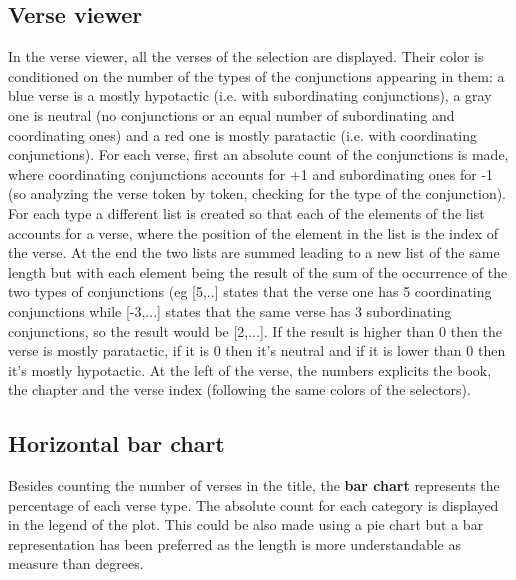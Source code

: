 \documentclass[sigchi]{article}
\begin{document}
\subsection{Verse viewer}
In the verse viewer, all the verses of the selection are displayed. Their color is conditioned on the number of the types of the conjunctions appearing in them: a blue verse is a mostly hypotactic (i.e. with subordinating conjunctions), a gray one is neutral (no conjunctions or an equal number of subordinating and coordinating ones) and a red one is mostly paratactic (i.e. with coordinating conjunctions). For each verse, first an absolute count of the conjunctions is made, where coordinating conjunctions accounts for +1 and subordinating ones for -1 (so analyzing the verse token by token, checking for the type of the conjunction). For each type a different list is created so that each of the elements of the list accounts for a verse, where the position of the element in the list is the index of the verse. At the end the two lists are summed leading to a new list of the same length but with each element being the result of the sum of the occurrence of the two types of conjunctions (eg [5,..] states that the verse one has 5 coordinating conjunctions while [-3,...] states that the same verse has 3 subordinating conjunctions, so the result would be [2,...]. If the result is higher than 0 then the verse is mostly paratactic, if it is 0 then it’s neutral and if it is lower than 0 then it’s mostly hypotactic.
At the left of the verse, the numbers explicits the book, the chapter and the verse index (following the same colors of the selectors).
\subsection{Horizontal bar chart}
Besides counting the number of verses in the title, the \textbf{bar chart} \cite{hbar} represents the percentage of each verse type. The absolute count for each category is displayed in the legend of the plot. This could be also made using a pie chart but a bar representation has been preferred as the length is more understandable as measure than degrees.
\end{document}
